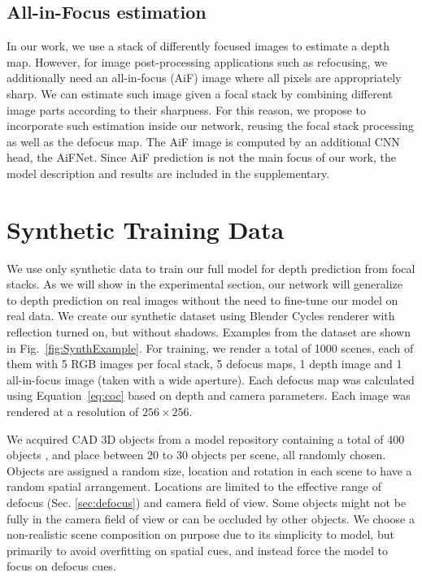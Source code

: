 \documentclass[10pt,twocolumn,letterpaper]{article}
\begin{document}
\subsection{All-in-Focus estimation} \label{sec:aif_est}


In our work, we use a stack of differently focused images to estimate a depth map. However, for image post-processing applications such as refocusing, we additionally need an all-in-focus (AiF) image where all pixels are appropriately sharp.
We can estimate such image given a focal stack by combining different image parts according to their sharpness. 
For this reason, we propose to incorporate such estimation inside our network, reusing the focal stack processing as well as the defocus map. The AiF image is computed by an additional CNN head, the AiFNet.
Since AiF prediction is not the main focus of our work, the model description and results are included in the supplementary.


\section{Synthetic Training Data} \label{sec:dataset}
We use only synthetic data to train our full model for depth prediction from focal stacks. As we will show in the experimental section, our network will generalize to depth prediction on real images without the need to fine-tune our model on real data.
We create our synthetic dataset using Blender \cite{blender2018} Cycles renderer with reflection turned on, but without shadows. Examples from the dataset are shown in Fig.~\ref{fig:SynthExample}.
For training, we render a total of 1000 scenes, each of them with 5 RGB images per focal stack, 5 defocus maps, 1 depth image and 1 all-in-focus image (taken with a wide aperture).
Each defocus map was calculated using Equation~\eqref{eq:coc} based on depth and camera parameters. Each image was rendered at a resolution of $256 \times 256$.


 We acquired CAD 3D objects from a model repository containing a total of 400 objects \cite{Thingi10K}, and place between 20 to 30 objects per scene, all randomly chosen. Objects are assigned a random size, location and rotation in each scene to have a random spatial arrangement. Locations are limited to the effective range of defocus (Sec. \ref{sec:defocus})  and camera field of view. 
Some objects might not be fully in the camera field of view or can be occluded by other objects.
We choose a non-realistic scene composition on purpose due to its simplicity to model, but primarily to avoid overfitting on spatial cues, and instead force the model to focus on defocus cues.
\end{document}
